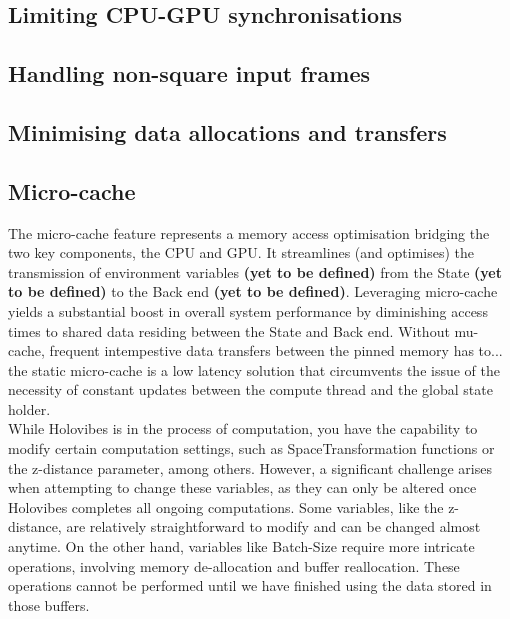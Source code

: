 \subsection{Limiting CPU-GPU synchronisations}


\subsection{Handling non-square input frames}


\subsection{Minimising data allocations and transfers}


\subsection{Micro-cache}
The micro-cache feature represents a memory access optimisation bridging the two key components, the CPU and GPU. It streamlines (and optimises) the transmission of environment variables \textbf{(yet to be defined)} from the State \textbf{(yet to be defined)} to the Back end \textbf{(yet to be defined)}. Leveraging micro-cache yields a substantial boost in overall system performance by diminishing access times to shared data residing between the State and Back end. Without mu-cache, frequent intempestive data transfers between the pinned memory has to...\\

the static micro-cache is a low latency solution that circumvents the issue of the necessity of constant updates between the compute thread and the global state holder.\\

While Holovibes is in the process of computation, you have the capability to modify certain computation settings, such as SpaceTransformation functions or the z-distance parameter, among others. However, a significant challenge arises when attempting to change these variables, as they can only be altered once Holovibes completes all ongoing computations. Some variables, like the z-distance, are relatively straightforward to modify and can be changed almost anytime. On the other hand, variables like Batch-Size require more intricate operations, involving memory de-allocation and buffer reallocation. These operations cannot be performed until we have finished using the data stored in those buffers.

